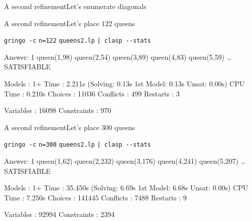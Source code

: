 \begin{frame}[fragile]{A second refinement}{Let's enumerate diagonals}
  \begin{block}{}%
    \lstset{basicstyle=\ttfamily\footnotesize,aboveskip=0pt,belowskip=0pt}%
                                                                                                       
     {\alert<3>{}}
                                                                                                       
\end{block}
\end{frame}
\begin{frame}[fragile]{A second refinement}{Let's place \alert{$122$} queens}
\begin{block}{\alert<1>{\lstinline{gringo -c} \alert{\lstinline{n=122}} \lstinline{queens2.lp} \lstinline{| clasp --stats}}}
\pause\footnotesize%
\begin{semiverbatim}
Answer: 1
queen(1,98) queen(2,54) queen(3,89) queen(4,83) queen(5,59) \dots{}
SATISFIABLE

Models      : 1+
\alert<2>{Time        : 2.211s} (Solving: 0.13s 1st Model: 0.13s Unsat: 0.00s)
CPU Time    : 0.210s
\alert<2>{Choices     : 11036}
\alert<2>{Conflicts   : 499}
Restarts    : 3

\alert<3>{Variables   : 16098}
\alert<3>{Constraints : 970}
\end{semiverbatim}
\end{block}
\end{frame}
\begin{frame}[fragile]{A second refinement}{Let's place \alert{$300$} queens}
\begin{block}{\alert<1>{\lstinline{gringo -c} \alert{\lstinline{n=300}} \lstinline{queens2.lp} \lstinline{| clasp --stats}}}
\pause\footnotesize%
\begin{semiverbatim}
Answer: 1
queen(1,62) queen(2,232) queen(3,176) queen(4,241) queen(5,207) \dots{}
SATISFIABLE

Models      : 1+
\alert<2-3>{Time        : 35.450s} (\alert<3>{Solving: 6.69s} 1st Model: 6.68s Unsat: 0.00s)
CPU Time    : 7.250s
\alert<2>{Choices     : 141445}
\alert<2>{Conflicts   : 7488}
Restarts    : 9

\alert<2>{Variables   : 92994}
\alert<2>{Constraints : 2394}
\end{semiverbatim}
\end{block}
\end{frame}
